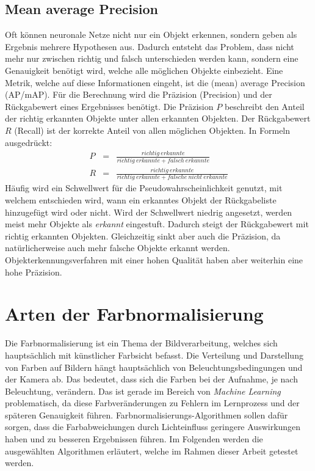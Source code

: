   \subsection{Mean average Precision}\label{s.map}
Oft können neuronale Netze nicht nur ein Objekt erkennen, sondern geben als Ergebnis mehrere Hypothesen aus. Dadurch entsteht das Problem, dass nicht mehr nur zwischen richtig und falsch unterschieden werden kann, sondern eine Genauigkeit benötigt wird, welche alle möglichen Objekte einbezieht. Eine Metrik, welche auf diese Informationen eingeht, ist die (mean) average Precision (AP/mAP). Für die Berechnung wird die Präzision (Precision) und der Rückgabewert eines Ergebnisses benötigt. Die Präzision $P$ beschreibt den Anteil der richtig erkannten Objekte unter allen erkannten Objekten. Der Rückgabewert $R$ (Recall) ist der korrekte Anteil von allen möglichen Objekten. In Formeln ausgedrückt:
\begin{eqnarray}
P&=&\frac{richtig\medspace erkannte}{richtig\medspace erkannte + falsch\medspace erkannte}\\
R&=&\frac{richtig\medspace erkannte}{richtig\medspace erkannte + falsche\medspace nicht\medspace erkannte}
\end{eqnarray}
Häufig wird ein Schwellwert für die Pseudowahrscheinlichkeit genutzt, mit welchem entschieden wird, wann ein erkanntes Objekt der Rückgabeliste hinzugefügt wird oder nicht. Wird der Schwellwert niedrig angesetzt, werden meist mehr Objekte als \textit{erkannt} eingestuft. Dadurch steigt der Rückgabewert mit richtig erkannten Objekten. Gleichzeitig sinkt aber auch die Präzision, da natürlicherweise auch mehr falsche Objekte erkannt werden. Objekterkennungsverfahren mit einer hohen Qualität haben aber weiterhin eine hohe Präzision.
\section{Arten der Farbnormalisierung}\label{s.farbnormalisierungen}  
Die Farbnormalisierung ist ein Thema der Bildverarbeitung, welches sich hauptsächlich mit künstlicher Farbsicht befasst. Die Verteilung und Darstellung von Farben auf Bildern hängt hauptsächlich von Beleuchtungsbedingungen und der Kamera ab. Das bedeutet, dass sich die Farben bei der Aufnahme, je nach Beleuchtung, verändern. Das ist gerade im Bereich von \textit{Machine Learning} problematisch, da diese Farbveränderungen zu Fehlern im Lernprozess und der späteren Genauigkeit führen. Farbnormalisierungs-Algorithmen sollen dafür sorgen, dass die Farbabweichungen durch Lichteinfluss geringere Auswirkungen haben und zu besseren Ergebnissen führen. Im Folgenden werden die ausgewählten Algorithmen erläutert, welche im Rahmen dieser Arbeit getestet werden.
